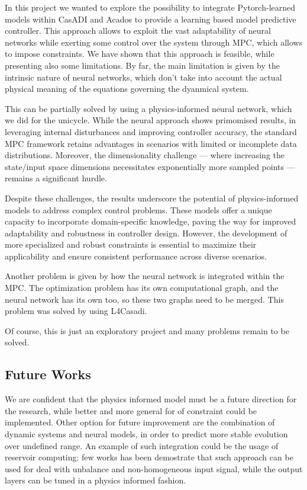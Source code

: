 In this project we wanted to explore the possibility to integrate
Pytorch-learned models within CasADI and Acados to provide a learning based
model predictive controller. This approach allows to exploit the vast
adaptability of neural networks while exerting some control over the system through MPC, which allows to impose
constraints.
We have shown that this approach is feasible, while presenting
also some limitations. 
By far, the main limitation is given by the
intrinsic nature of neural networks, which don't take into account the
actual physical meaning of the equations governing the dyanmical system.


This can be partially solved by using a physics-informed neural network,
which we did for the unicycle. While the neural approach shows primomised results, in leveraging internal disturbances and improving controller accuracy,
the standard MPC framework retains advantages in scenarios with limited or incomplete data distributions. 
Moreover, the dimensionality challenge — where increasing the state/input space dimensions necessitates exponentially more sampled points — remains a significant hurdle.

Despite these challenges, the results underscore the potential of physics-informed models to address complex control problems.
These models offer a unique capacity to incorporate domain-specific knowledge, paving the way for improved adaptability and robustness in controller design. 
However, the development of more specialized and robust constraints is essential to maximize their applicability and ensure consistent performance across diverse scenarios. 


Another problem is given by how the neural
network is integrated within the MPC. The optimization problem has its own
computational graph, and the neural network has its own too, so these two
graphs need to be merged. This problem was solved by using L4Casadi. 

Of course, this is just an exploratory project and many problems remain to be
solved.


\subsection{Future Works}

We are confident that the physics informed model must be a future direction for the research, while better and more general for 
of constraint could be implemented.
Other option for future improvement are the combination of dynamic systems and neural models, in order to predict more stable evolution over undefined range.
An example of such integration could be the usage of reservoir computing: few works has been demostrate that such approach
can be used for deal with unbalance and non-homogeneous input signal, while the output layers can be tuned in a physics informed fashion.

